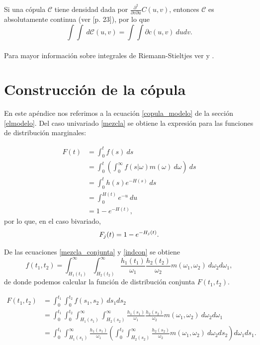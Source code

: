 \documentclass[11pt,a4paper]{article}
\newcommand{\C}{\mathcal{C}}
\begin{document}
\begin{appendices}
Si una cópula $\C$ tiene densidad dada por $\frac{\partial ^2}{\partial v \partial u} C(u, v)$, entonces $\C$ es absolutamente continua (ver \citet{nelsen}[p. 23]), por lo que $$\int\int \ d\C(u,v) = \int\int \partial c(u, v) \ dudv.$$\\

Para mayor información sobre integrales de Riemann-Stieltjes ver \citet{rudin} y \citet{bartle}.

\newpage

\section{Construcción de la cópula} \label{construccion_copula}

En este apéndice nos referimos a la ecuación \eqref{copula_modelo} de la sección \ref{elmodelo}. Del caso univariado \eqref{mezcla} se obtiene la expresión para las funciones de distribución marginales:

\begin{align*}
F(t) &= \int_0^t f(s) \ ds\\
&= \int_0^t\left(\int_0^\infty f(s|\omega)m(\omega) \ d\omega \right) \ ds\\
&= \int_0^t h(s)e^{-H(s)} \ ds\\
&= \int_0^{H(t)} e^{-u} \ du\\
&= 1-e^{-H(t)},
\end{align*}
por lo que, en el caso bivariado,
\begin{equation}\label{dist_marginal}
F_j(t) = 1-e^{-H_j(t)}.\\
\end{equation}

De las ecuaciones \eqref{mezcla_conjunta} y \eqref{indcon} se obtiene $$f(t_1, t_2) = \int_{H_1(t_1)}^\infty \int_{H_2(t_2)}^\infty \frac{h_1(t_1)}{\omega_1}\frac{h_2(t_2)}{\omega_2}m(\omega_1, \omega_2) \ d\omega_2 d\omega_1,$$ de donde podemos calcular la función de distribución conjunta $F(t_1, t_2)$.

\begin{align*}
F(t_1, t_2) &= \int_0^{t_1} \int_0^{t_2} f(s_1, s_2) \ ds_1 ds_2\\
&= \int_0^{t_1} \int_0^{t_2}\int_{H_1(s_1)}^\infty \int_{H_2(s_2)}^\infty \frac{h_1(s_1)}{\omega_1}\frac{h_2(s_2)}{\omega_2}m(\omega_1, \omega_2) \ d\omega_2 d\omega_1\\
&= \int_0^{t_1}\int_{H_1(s_1)}^\infty \frac{h_1(s_1)}{\omega_1}\left(\int_0^{t_2} \int_{H_2(s_2)}^\infty \frac{h_2(s_2)}{\omega_2} m(\omega_1, \omega_2) \ d\omega_2 ds_2 \right) d\omega_1 ds_1.
\end{align*}


\end{appendices}
\end{document}
